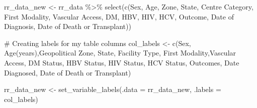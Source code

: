 \documentclass[
  letterpaper,
  DIV=11,
  numbers=noendperiod]{scrartcl}
\newenvironment{Shaded}{\begin{snugshade}}{\end{snugshade}}
\newcommand{\AttributeTok}[1]{\textcolor[rgb]{0.40,0.45,0.13}{#1}}
\newcommand{\CommentTok}[1]{\textcolor[rgb]{0.37,0.37,0.37}{#1}}
\newcommand{\FunctionTok}[1]{\textcolor[rgb]{0.28,0.35,0.67}{#1}}
\newcommand{\NormalTok}[1]{\textcolor[rgb]{0.00,0.23,0.31}{#1}}
\newcommand{\OtherTok}[1]{\textcolor[rgb]{0.00,0.23,0.31}{#1}}
\newcommand{\SpecialCharTok}[1]{\textcolor[rgb]{0.37,0.37,0.37}{#1}}
\newcommand{\StringTok}[1]{\textcolor[rgb]{0.13,0.47,0.30}{#1}}
\begin{document}
\begin{Shaded}
\begin{Highlighting}[]
\NormalTok{rr\_data\_new }\OtherTok{\textless{}{-}}\NormalTok{ rr\_data }\SpecialCharTok{\%\textgreater{}\%} 
  \FunctionTok{select}\NormalTok{(}\FunctionTok{c}\NormalTok{(Sex, Age, Zone, State, }\StringTok{\textasciigrave{}}\AttributeTok{Centre Category}\StringTok{\textasciigrave{}}\NormalTok{, }\StringTok{\textasciigrave{}}\AttributeTok{First Modality}\StringTok{\textasciigrave{}}\NormalTok{, }\StringTok{\textasciigrave{}}\AttributeTok{Vascular Access}\StringTok{\textasciigrave{}}\NormalTok{, DM, HBV, HIV, HCV, Outcome, }\StringTok{\textasciigrave{}}\AttributeTok{Date of Diagnosis}\StringTok{\textasciigrave{}}\NormalTok{, }\StringTok{\textasciigrave{}}\AttributeTok{Date of Death or Transplant}\StringTok{\textasciigrave{}}\NormalTok{))}

\CommentTok{\# Creating labels for my table columns}
\NormalTok{col\_labels }\OtherTok{\textless{}{-}} \FunctionTok{c}\NormalTok{(}\StringTok{\textquotesingle{}Sex\textquotesingle{}}\NormalTok{, }\StringTok{\textquotesingle{}Age(years)\textquotesingle{}}\NormalTok{,}\StringTok{\textquotesingle{}Geopolitical Zone\textquotesingle{}}\NormalTok{, }\StringTok{\textquotesingle{}State\textquotesingle{}}\NormalTok{, }\StringTok{\textquotesingle{}Facility Type\textquotesingle{}}\NormalTok{, }\StringTok{\textquotesingle{}First Modality\textquotesingle{}}\NormalTok{,}\StringTok{\textquotesingle{}Vascular Access\textquotesingle{}}\NormalTok{, }\StringTok{\textquotesingle{}DM Status\textquotesingle{}}\NormalTok{, }\StringTok{\textquotesingle{}HBV Status\textquotesingle{}}\NormalTok{, }\StringTok{\textquotesingle{}HIV Status\textquotesingle{}}\NormalTok{, }\StringTok{\textquotesingle{}HCV Status\textquotesingle{}}\NormalTok{, }\StringTok{\textquotesingle{}Outcomes\textquotesingle{}}\NormalTok{, }\StringTok{\textquotesingle{}Date Diagnosed\textquotesingle{}}\NormalTok{, }\StringTok{\textquotesingle{}Date of Death or Transplant\textquotesingle{}}\NormalTok{)}

\NormalTok{rr\_data\_new }\OtherTok{\textless{}{-}} \FunctionTok{set\_variable\_labels}\NormalTok{(}\AttributeTok{.data =}\NormalTok{ rr\_data\_new, }\AttributeTok{.labels =}\NormalTok{ col\_labels)}


\end{Highlighting}
\end{Shaded}
\end{document}
